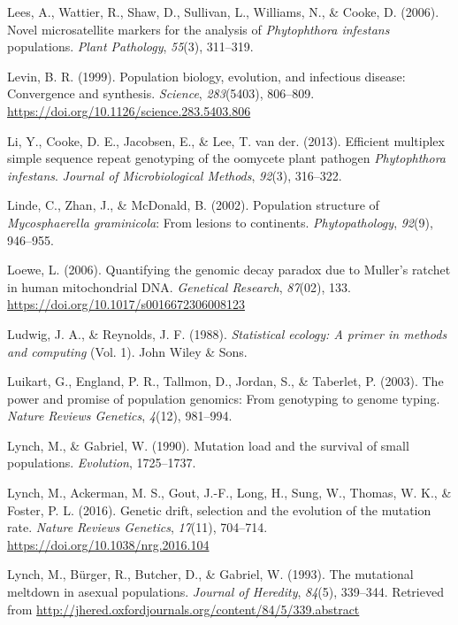 \documentclass[double,11pt]{beavtex}
\begin{document}
  \hypertarget{ref-lees2006novel}{}
  Lees, A., Wattier, R., Shaw, D., Sullivan, L., Williams, N., \& Cooke,
  D. (2006). Novel microsatellite markers for the analysis of
  \emph{Phytophthora infestans} populations. \emph{Plant Pathology},
  \emph{55}(3), 311--319.
  
  \hypertarget{ref-levin1999population}{}
  Levin, B. R. (1999). Population biology, evolution, and infectious
  disease: Convergence and synthesis. \emph{Science}, \emph{283}(5403),
  806--809. \url{https://doi.org/10.1126/science.283.5403.806}
  
  \hypertarget{ref-li2013efficient}{}
  Li, Y., Cooke, D. E., Jacobsen, E., \& Lee, T. van der. (2013).
  Efficient multiplex simple sequence repeat genotyping of the oomycete
  plant pathogen \emph{Phytophthora infestans}. \emph{Journal of
  Microbiological Methods}, \emph{92}(3), 316--322.
  
  \hypertarget{ref-linde2002population}{}
  Linde, C., Zhan, J., \& McDonald, B. (2002). Population structure of
  \emph{Mycosphaerella graminicola}: From lesions to continents.
  \emph{Phytopathology}, \emph{92}(9), 946--955.
  
  \hypertarget{ref-loewe2006quantifying}{}
  Loewe, L. (2006). Quantifying the genomic decay paradox due to Muller's
  ratchet in human mitochondrial DNA. \emph{Genetical Research},
  \emph{87}(02), 133. \url{https://doi.org/10.1017/s0016672306008123}
  
  \hypertarget{ref-ludwig1988statistical}{}
  Ludwig, J. A., \& Reynolds, J. F. (1988). \emph{Statistical ecology: A
  primer in methods and computing} (Vol. 1). John Wiley \& Sons.
  
  \hypertarget{ref-luikart2003power}{}
  Luikart, G., England, P. R., Tallmon, D., Jordan, S., \& Taberlet, P.
  (2003). The power and promise of population genomics: From genotyping to
  genome typing. \emph{Nature Reviews Genetics}, \emph{4}(12), 981--994.
  
  \hypertarget{ref-lynch1990mutation}{}
  Lynch, M., \& Gabriel, W. (1990). Mutation load and the survival of
  small populations. \emph{Evolution}, 1725--1737.
  
  \hypertarget{ref-lynch2016genetic}{}
  Lynch, M., Ackerman, M. S., Gout, J.-F., Long, H., Sung, W., Thomas, W.
  K., \& Foster, P. L. (2016). Genetic drift, selection and the evolution
  of the mutation rate. \emph{Nature Reviews Genetics}, \emph{17}(11),
  704--714. \url{https://doi.org/10.1038/nrg.2016.104}
  
  \hypertarget{ref-lynch1993mutational}{}
  Lynch, M., Bürger, R., Butcher, D., \& Gabriel, W. (1993). The
  mutational meltdown in asexual populations. \emph{Journal of Heredity},
  \emph{84}(5), 339--344. Retrieved from
  \url{http://jhered.oxfordjournals.org/content/84/5/339.abstract}
  
\end{document}
